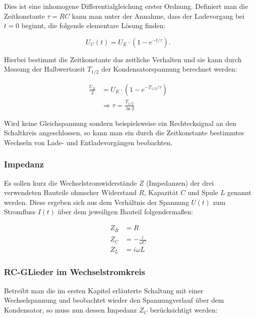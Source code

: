 \documentclass{article}
\begin{document}
Dies ist eine inhomogene Differentialgleichung erster Ordnung. Definiert man die Zeitkonstante $\tau = RC$ kann man unter der Annahme, dass der Ladevorgang bei $t=0$ beginnt, die folgende elementare Lösung finden:

\begin{equation}
    U_C (t) = U_E \cdot ( 1 - e^{-t/\tau}).
\end{equation}

Hierbei bestimmt die Zeitkonstante das zeitliche Verhalten und sie kann durch Messung der Halbwertszeit $T_{1/2}$ der Kondensatorspannung berechnet werden:

\begin{equation}
    \begin{split}
        \frac{U_E}{2} &= U_E \cdot ( 1 - e^{-T_{1/2}/\tau}) \\
        &\Rightarrow \tau = \frac{T_{1/2}}{\ln{2}}
    \end{split}
    \label{eq:E_zeitkonst}
\end{equation}

Wird keine Gleichspannung sondern beispielsweise ein Rechtecksignal an den Schaltkreis angeschlossen, so kann man ein durch die Zeitkonstante bestimmtes Wechseln von Lade- und Entladevorgängen beobachten. 


\subsubsection{Impedanz}

Es sollen kurz die Wechselstromwiderstände $Z$ (Impedanzen) der drei verwendeten Bauteile ohmscher Widerstand $R$, Kapazität $C$ und Spule $L$ genannt werden. Diese ergeben sich aus dem Verhältnis der Spannung $U(t)$ zum Stromfluss $I(t)$ über dem jeweiligen Bauteil folgendermaßen:

\begin{equation}
    \begin{split}
        Z_R &= R \\
        Z_C &= - \frac{i}{\omega C} \\
        Z_L &= i \omega L
    \end{split}
\end{equation}

\subsubsection{RC-GLieder im Wechselstromkreis}

Betreibt man die im ersten Kapitel erläuterte Schaltung mit einer Wechselspannung und beobachtet wieder den Spannungverlauf über dem Kondensator, so muss nun dessen Impedanz $Z_C$ berücksichtigt werden:
\end{document}
